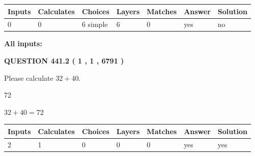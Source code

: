 \documentclass[12pt]{article}
\begin{document}
 
\noindent{}
 
 
   
   
   
   
\noindent\begin{tabular}{|l|l|l|l|l|l|l|}
 \hline
Inputs & Calculates & Choices & Layers & Matches & Answer & Solution \\ \hline
 0  & 
 0  & 
 6
  simple  
  & 
 6  & 
 0  & 
  yes & 
  no 
  \\ \hline
 \end{tabular}
   
   
   
   
\noindent{}
   
   
   
   
\noindent\vspace{0.1in}\hspace{-0.08in} {\textbf{\Large{All inputs: }}}
   
   
  
\vspace{0.2in}
  
{\textbf{\Large{QUESTION
441.2 
 ( 1 , 1 , 6791 )
}}}
  
  
 
Please calculate $ %
32 +  %
40 $.
 
 
 
\noindent{}
 
 

72
 
 
\noindent{}
 
 

 
 
 
\noindent{}
 
 

$ %
32 +  %
40=   %
72$
 
 
\noindent{}
 
 

 
   
   
   
   
\noindent\begin{tabular}{|l|l|l|l|l|l|l|}
 \hline
Inputs & Calculates & Choices & Layers & Matches & Answer & Solution \\ \hline
 2  & 
 1  & 
 0
  & 
 0  & 
 0  & 
  yes & 
  yes 
  \\ \hline
 \end{tabular}
   
\end{document}
